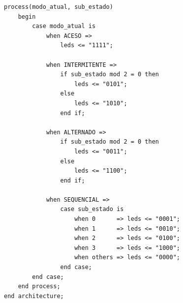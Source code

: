 \documentclass[12pt,a4paper, brazil]{article}
\begin{document}
\begin{lstlisting}[style=vhdl, caption={Arquivo \texttt{corsimcornao.vhd}.}]
    process(modo_atual, sub_estado)
    begin
        case modo_atual is
            when ACESO =>
                leds <= "1111";

            when INTERMITENTE =>
                if sub_estado mod 2 = 0 then
                    leds <= "0101";
                else
                    leds <= "1010";
                end if;

            when ALTERNADO =>
                if sub_estado mod 2 = 0 then
                    leds <= "0011";
                else
                    leds <= "1100";
                end if;

            when SEQUENCIAL =>
                case sub_estado is
                    when 0      => leds <= "0001";
                    when 1      => leds <= "0010";
                    when 2      => leds <= "0100";
                    when 3      => leds <= "1000";
                    when others => leds <= "0000";
                end case;
        end case;
    end process;
end architecture;
\end{lstlisting}
\end{document}
